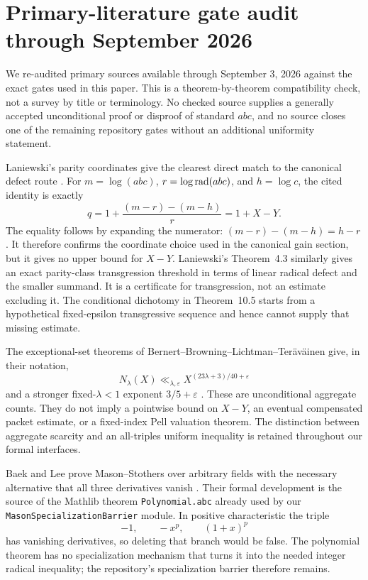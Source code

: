 \section{Primary-literature gate audit through September 2026}
\label{sec:primary-literature-gate-audit}

We re-audited primary sources available through September 3, 2026 against the
exact gates used in this paper.  This is a theorem-by-theorem compatibility
check, not a survey by title or terminology.  No checked source supplies a
generally accepted unconditional proof or disproof of standard $abc$, and no
source closes one of the remaining repository gates without an additional
uniformity statement.

Laniewski's parity coordinates give the clearest direct match to the canonical
defect route \cite[Proposition~3.7 and Corollary~3.9]{Laniewski2026RadicalDefects}.
For $m=\log(abc)$, $r=\log\operatorname{rad}(abc)$, and $h=\log c$, the cited identity is
exactly
\[
 q=1+\frac{(m-r)-(m-h)}{r}=1+X-Y.
\]
The equality follows by expanding the numerator:
$(m-r)-(m-h)=h-r$.  It therefore confirms the coordinate choice used in the
canonical gain section, but it gives no upper bound for $X-Y$.
Laniewski's Theorem~4.3 similarly gives an exact parity-class transgression
threshold in terms of linear radical defect and the smaller summand.  It is a
certificate for transgression, not an estimate excluding it.  The conditional
dichotomy in Theorem~10.5 starts from a hypothetical fixed-epsilon
transgressive sequence and hence cannot supply that missing estimate.

The exceptional-set theorems of
Bernert--Browning--Lichtman--Ter\"av\"ainen give, in their notation,
\[
 N_\lambda(X)\ll_{\lambda,\varepsilon}
 X^{(23\lambda+3)/40+\varepsilon}
\]
and a stronger fixed-$\lambda<1$ exponent $3/5+\varepsilon$
\cite[Theorems~1.2--1.3]{BBLT}.  These are unconditional aggregate counts.
They do not imply a pointwise bound on $X-Y$, an eventual compensated packet
estimate, or a fixed-index Pell valuation theorem.  The distinction between
aggregate scarcity and an all-triples uniform inequality is retained
throughout our formal interfaces.

Baek and Lee prove Mason--Stothers over arbitrary fields with the necessary
alternative that all three derivatives vanish
\cite[Theorem~1]{BaekLee2024Mason}.  Their formal development is the source of
the Mathlib theorem \texttt{Polynomial.abc} already used by our
\texttt{MasonSpecializationBarrier} module.  In positive characteristic the
triple
\[
 -1,\qquad -x^p,\qquad (1+x)^p
\]
has vanishing derivatives, so deleting that branch would be false.  The
polynomial theorem has no specialization mechanism that turns it into the
needed integer radical inequality; the repository's specialization barrier
therefore remains.

